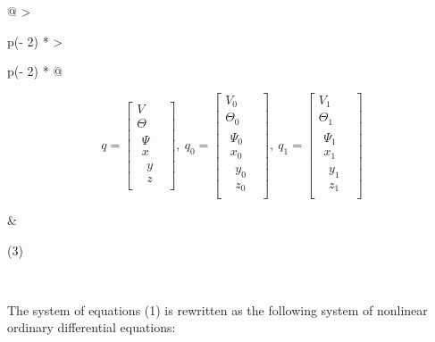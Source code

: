 \begin{longtable}[]{@{}
  >{\raggedright\arraybackslash}p{(\columnwidth - 2\tabcolsep) * }
  >{\raggedright\arraybackslash}p{(\columnwidth - 2\tabcolsep) * }@{}}
\begin{minipage}[b]{\linewidth}\raggedright
\[q = \begin{bmatrix}
V \\
\Theta \\
\begin{matrix}
\Psi \\
x \\
\begin{matrix}
y \\
z
\end{matrix}
\end{matrix}
\end{bmatrix},\ q_{0} = \begin{bmatrix}
V_{0} \\
\Theta_{0} \\
\begin{matrix}
\Psi_{0} \\
x_{0} \\
\begin{matrix}
y_{0} \\
z_{0}
\end{matrix}
\end{matrix}
\end{bmatrix},\ q_{1} = \begin{bmatrix}
V_{1} \\
\Theta_{1} \\
\begin{matrix}
\Psi_{1} \\
x_{1} \\
\begin{matrix}
y_{1} \\
z_{1}
\end{matrix}
\end{matrix}
\end{bmatrix}\]
\end{minipage} & \begin{minipage}[b]{\linewidth}\raggedright
(3)
\end{minipage} \\
\end{longtable}



The system of equations (1) is rewritten as the following system of
nonlinear ordinary differential equations:

